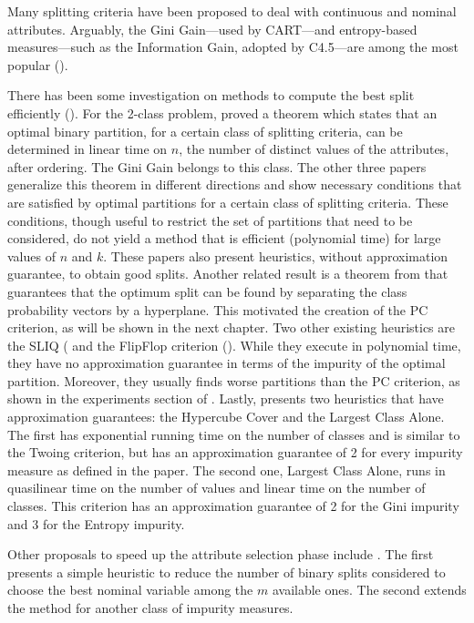 Many splitting criteria have been proposed to 
deal with continuous and nominal attributes.
Arguably, the Gini Gain---used by CART---and entropy-based measures---such as 
the Information Gain, adopted by C4.5---are among
the most popular (\cite{books/sp/datamining2005/RokachM05,
Loh2014,series/sbcs/BarrosCF15}).

There has been  some investigation on 
methods to compute the best split efficiently 
(\cite{Breiman84,Chou:91,BPKN:92,journals/datamine/CoppersmithHH99}).
For the 2-class problem,  \cite{Breiman84} proved a theorem which states that an optimal
binary partition, for a certain class of splitting criteria,
can be determined in linear time on $n$, the number of distinct values of the attributes, after ordering.
The Gini  Gain belongs to this class.
The  other  three papers generalize
this theorem  in different directions 
and show necessary conditions that are satisfied by optimal partitions for a certain class of splitting criteria. 
These conditions, though useful to restrict the set of partitions
that need to be considered, do not yield  a method that
is efficient (polynomial time) for large values of $n$ and $k$. These papers also  present  heuristics, without approximation guarantee, to obtain good splits.
Another related result is a theorem from \cite{journals/datamine/CoppersmithHH99} that guarantees that the optimum split can be found by separating the class probability vectors by a hyperplane. This motivated the creation of the PC criterion, as will be shown in the next chapter. Two other existing heuristics are the SLIQ (\cite{mehta1996sliq} and the FlipFlop criterion (\cite{nadas1991iterative}). While they execute in polynomial time, they have no approximation guarantee in terms of the impurity of the optimal partition. Moreover, they usually finds worse partitions than the PC criterion, as shown in the experiments section of \cite{journals/datamine/CoppersmithHH99}. Lastly, \cite{icml2018} presents two heuristics that have approximation guarantees: the Hypercube Cover and the Largest Class Alone. The first has exponential running time on the number of classes and is similar to the Twoing criterion, but has an approximation guarantee of 2 for every impurity measure as defined in the paper. The second one, Largest Class Alone, runs in quasilinear time on the number of values and linear time on the number of classes. This criterion has an approximation guarantee of 2 for the Gini impurity and 3 for the Entropy impurity. 

Other proposals to  speed up the attribute selection phase
 include  \cite{MolaSiciliano1997,Shih2001}. 
The first presents a simple  heuristic
to reduce the number of binary splits considered to
choose the best nominal variable among the $m$ available ones.
 The second   extends the method for another class
of impurity measures.

